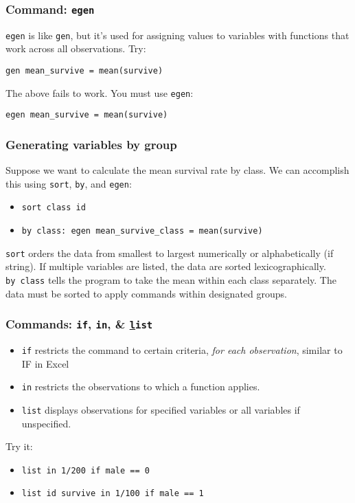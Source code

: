 \documentclass[11pt]{beamer}
\begin{document}
\begin{frame}
\frametitle{Command: \texttt{egen}}
\texttt{egen} is like \texttt{gen}, but it's used for assigning values to variables with functions that work across all observations. Try:
        \begin{center}
            \texttt{\alert{gen} mean\_survive = mean(survive)} \\
            \pause
            \bigskip
        \end{center}
 The above fails to work. You must use \texttt{egen}:
        \begin{center}
            \texttt{\alert{egen} mean\_survive = mean(survive)}
        \end{center}
\end{frame}

\begin{frame}
\frametitle{Generating variables by group}
Suppose we want to calculate the mean survival rate by class. We can accomplish this using \texttt{sort}, \texttt{by}, and \texttt{egen}:
\begin{itemize}
	\item \texttt{sort class id}
	\item \texttt{by class: egen mean\_survive\_class = mean(survive)}
\end{itemize} \pause \bigskip
\texttt{sort} orders the data from smallest to largest numerically or alphabetically (if string). If multiple variables are listed, the data are sorted lexicographically.  \\ \pause \bigskip
\texttt{by class} tells the program to take the mean within each class separately. The data must be sorted to apply commands within designated groups. 
\end{frame}

\begin{frame}
\frametitle{Commands: \texttt{if}, \texttt{in}, \& \texttt{\underline{l}ist}}
\begin{itemize}
	\item \texttt{if} restricts the command to certain criteria, \textit{for each observation}, similar to IF in Excel \pause
	\item \texttt{in} restricts the observations to which a function applies. \pause
	\item \texttt{list} displays observations for specified variables or all variables if unspecified.  
\end{itemize} \medskip \pause
Try it:
\begin{itemize} 
	\item[] \texttt{list in 1/200 if male == 0}
	\item[] \texttt{list id survive in 1/100 if male == 1}
\end{itemize} 
\end{frame}
\end{document}
